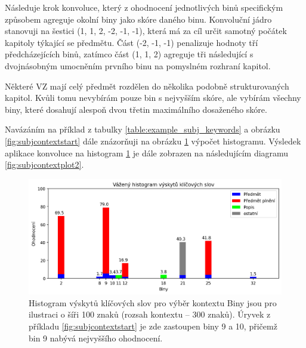 \documentclass[thesis=M,czech]{FITthesis}[2019/12/23]
\newenvironment{example}{\begin{adjustwidth}{1cm}{}}{\end{adjustwidth}}
\begin{document}
\begin{enumerate}
    Následuje krok konvoluce, který z ohodnocení jednotlivých binů specifickým způsobem agreguje okolní biny jako skóre daného binu. Konvoluční jádro stanovuji na šestici (1, 1, 2, -2, -1, -1), která má za cíl určit samotný počátek kapitoly týkající se předmětu. Část (-2, -1, -1) penalizuje hodnoty tří předcházejících binů, zatímco část (1, 1, 2) agreguje tři následující s dvojnásobným umocněním prvního binu na pomyslném rozhraní kapitol.
    
    Některé VZ mají celý předmět rozdělen do několika podobně strukturovaných kapitol. Kvůli tomu nevybírám pouze bin s nejvyšším skóre, ale vybírám všechny biny, které dosahují alespoň dvou třetin maximálního dosaženého skóre.

        Navázáním na příklad z tabulky \ref{table:example_subj_keywords} a obrázku \ref{fig:subjcontextstart} dále znázorňuji na obrázku \ref{fig:subjcontextplot} výpočet histogramu. Výsledek aplikace konvoluce na histogram \ref{fig:subjcontextplot} je dále zobrazen na následujícím diagramu \ref{fig:subjcontextplot2}.
        
        \begin{figure}\centering
        	\includegraphics[width=1\textwidth]{images/subj_context_plot.png}
        	\caption[Histogram výskytů klíčových slov pro výběr kontextu]{Histogram výskytů klíčových slov pro výběr kontextu\newline
        	Biny jsou pro ilustraci o šíři 100 znaků (rozsah kontextu -- 300 znaků).  Úryvek z příkladu \ref{fig:subjcontextstart} je zde zastoupen biny 9 a 10, přičemž bin 9 nabývá nejvyššího ohodnocení.}\label{fig:subjcontextplot}
        \end{figure}
        

\end{enumerate}
\end{document}
